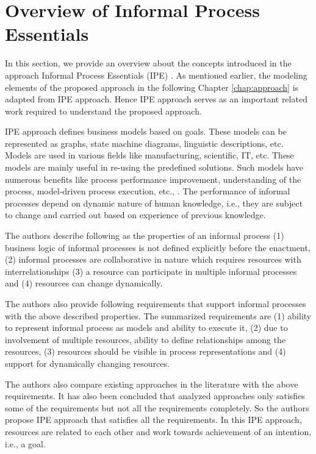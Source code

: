 \section{Overview of Informal Process Essentials}
\label{sec:basicconcepts}
In this section, we provide an overview about the concepts introduced in the approach Informal Process Essentials (IPE) \cite{Sungur2014a}. As mentioned earlier, the modeling elements of the proposed approach in the following Chapter \ref{chap:approach} is adapted from IPE approach. Hence IPE approach serves as an important related work required to understand the proposed approach. 

IPE approach defines business models based on goals. These models can be represented as graphs, state machine diagrams, linguistic descriptions, etc. Models are used in various fields like manufacturing, scientific, IT, etc. These models are mainly useful in re-using the predefined solutions. Such models have numerous benefits like process performance improvement, understanding of the process, model-driven process execution, etc., \cite{Indulska2009}. The performance of informal processes depend on dynamic nature of human knowledge, i.e., they are subject to change and carried out based on experience of previous knowledge. 

The authors describe following as the properties of an informal process (1) business logic of informal processes is not defined explicitly before the enactment, (2) informal processes are collaborative in nature which requires resources with interrelationships (3) a resource can participate in multiple informal processes and (4) resources can change dynamically.

The authors also provide following requirements that support informal processes with the above described properties. The summarized requirements are (1) ability to represent informal process as models and ability to execute it, (2) due to involvement of multiple resources, ability to define relationships among the resources, (3) resources should be visible in process representations and (4) support for dynamically changing resources. 

The authors also compare existing approaches in the literature with the above requirements. It has also been concluded that analyzed approaches only satisfies some of the requirements but not all the requirements completely. So the authors propose IPE approach that satisfies all the requirements. In this IPE approach, resources are related to each other and work towards achievement of an intention, i.e., a goal.   

